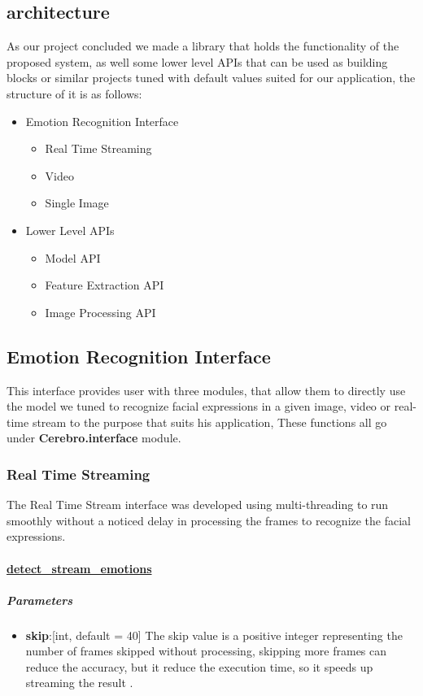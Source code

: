 \subsection{architecture}
As our project concluded we made a library that holds the functionality of the proposed system, as well some lower level APIs that can be used as building blocks or similar projects tuned with default values suited for our application, the structure of it is as follows:
\begin{itemize}
	\item Emotion Recognition Interface 
	\begin{itemize}[noitemsep,nolistsep]
		\item Real Time Streaming
		\item Video
		\item Single Image
	\end{itemize}
	\item Lower Level APIs
	\begin{itemize}[noitemsep,nolistsep]
		\item Model API
		\item Feature Extraction API
		\item Image Processing API
	\end{itemize}
\end{itemize}

\subsection{Emotion Recognition Interface}
This interface provides user with three modules, that allow them to directly use the model we tuned to recognize facial expressions in a given image, video or real-time stream to the purpose that suits his application, These functions all go under \textbf{Cerebro.interface} module.

\subsubsection{Real Time Streaming}
The Real Time Stream interface was developed using multi-threading to run smoothly without a noticed delay in processing the frames to recognize the facial expressions. 

\paragraph{\underline{detect\_stream\_emotions}}%
\subparagraph{Parameters}
\begin{changemargin}{0.5cm}{0cm}
	\begin{itemize}[noitemsep,nolistsep]
		\item\textbf{skip}:[int, default = 40] The skip value is a positive integer representing the number of frames skipped without processing, skipping more frames can reduce the accuracy, but it reduce the execution time, so it speeds up streaming the result .
	\end{itemize}
\end{changemargin}

